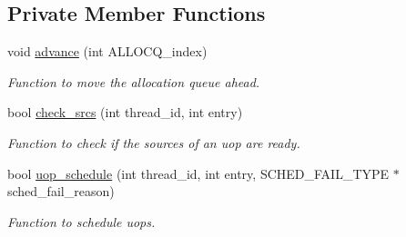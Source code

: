 \subsection*{Private Member Functions}
\begin{DoxyCompactItemize}
\item 
void \hyperlink{classschedule__smc__c_a7f3ddbde213ee0afe9ba6af280bd6410}{advance} (int ALLOCQ\_\-index)
\begin{DoxyCompactList}\small\item\em Function to move the allocation queue ahead. \item\end{DoxyCompactList}\item 
bool \hyperlink{classschedule__smc__c_acb5620b01fbcee7106da60275f6c4ec1}{check\_\-srcs} (int thread\_\-id, int entry)
\begin{DoxyCompactList}\small\item\em Function to check if the sources of an uop are ready. \item\end{DoxyCompactList}\item 
bool \hyperlink{classschedule__smc__c_a663a2b4622b94a2b2b64110b5787015c}{uop\_\-schedule} (int thread\_\-id, int entry, SCHED\_\-FAIL\_\-TYPE $\ast$sched\_\-fail\_\-reason)
\begin{DoxyCompactList}\small\item\em Function to schedule uops. \item\end{DoxyCompactList}\end{DoxyCompactItemize}
